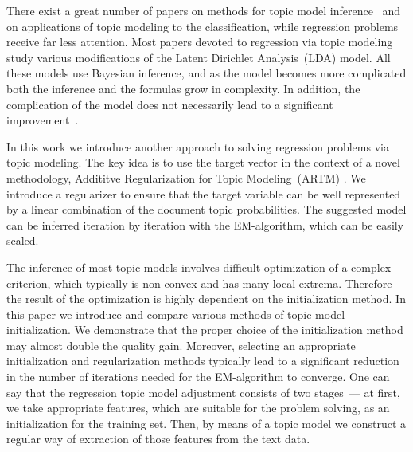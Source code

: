 \documentclass{sig-alternate-2013}
\begin{document}

There exist a great number of papers on methods for topic model
inference~\cite{blei03lda, porteous08collapsed, mimno12stochastic}
and on applications of topic modeling to the classification,
while regression problems receive far less attention.
Most papers devoted to regression via topic modeling~\cite{blei07supervised, zhu09medlda, rabinovich14irtm, mimno08arbitrary}
study various modifications of the Latent Dirichlet Analysis~(LDA) model.
All these models use Bayesian inference,
and as the model becomes more complicated both the inference
and the formulas grow in complexity.
In addition, the complication of the model does not necessarily
lead to a significant improvement~\cite{zhu09medlda}.


In this work we introduce another approach to solving regression problems via topic modeling.
The key idea is to use the target vector in the context of
a novel methodology, Addititve Regularization for Topic Modeling~(ARTM) \cite{vorontsov14artm}.
We introduce a regularizer to ensure that
the target variable can be well represented by a linear combination of
the document topic probabilities.
The suggested model can be inferred iteration by iteration
with the EM-algorithm, which can be easily scaled.


The inference of most topic models involves difficult optimization of a complex criterion,
which typically is non-convex and has many local extrema.
Therefore the result of the optimization is highly dependent on the initialization method.
In this paper we introduce and compare various methods of topic model initialization.
We demonstrate that the proper choice of the initialization method may almost double the quality gain.
Moreover, selecting an appropriate initialization and regularization methods
typically lead to a significant reduction in the number of iterations needed for the EM-algorithm to converge.
One can say that the regression topic model adjustment consists of two stages~--- at first,
we take appropriate features, which are suitable for the problem solving, as an initialization
for the training set. Then, by means of a topic model we construct a regular way of extraction of those
features from the text data.
\end{document}

